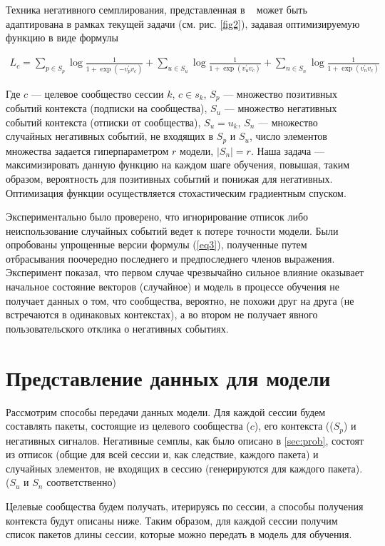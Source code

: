 \documentclass[times,specification,annotation]{itmo-student-thesis}
\begin{document}
Техника негативного семплирования, представленная в ~\cite{airbnb} может быть адаптирована в рамках текущей задачи (см. рис. \ref{fig2}), задавая оптимизируемую функцию в виде формулы

\begin{align}
L_c = \sum_{p \in S_p} \log \frac{1}{1 + \exp(-v_p^{'}v_c)} + \sum_{u \in S_u} \log \frac{1}{1 + \exp(v_u^{'}v_c)} + \sum_{n \in S_n} \log \frac{1}{1 + \exp(v_n^{'}v_c)} \label{eq3}
\end{align}

Где $c$ --- целевое сообщество сессии $k$, $c \in s_k$, $S_p$ --- множество позитивных событий
контекста (подписки на сообщества), $S_u$ --- множество негативных событий
контекста (отписки от сообщества), $S_u = u_k$, $S_n$ --- множество случайных негативных
событий, не входящих в $S_p$ и $S_u$, число элементов множества задается гиперпараметром $r$ модели, $|S_n| = r$. Наша задача --- максимизировать данную
функцию на каждом шаге обучения, повышая, таким образом, вероятность для
позитивных событий и понижая для негативных. Оптимизация функции осуществляется стохастическим градиентным спуском. 

Экспериментально было проверено, что игнорирование отписок либо неиспользование случайных событий ведет к потере точности модели. Были опробованы упрощенные версии формулы (\ref{eq3}), полученные путем отбрасывания
поочередно последнего и предпоследнего членов выражения. Эксперимент показал, что первом случае чрезвычайно сильное
влияние оказывает начальное состояние векторов (случайное) и модель в процессе обучения не получает данных о том, что сообщества, вероятно,
не похожи друг на друга (не встречаются в одинаковых контекстах), а во втором не получает явного пользовательского отклика о негативных событиях. 

\section{Представление данных для модели}\label{sec:dataf}

Рассмотрим способы передачи данных модели.
Для каждой сессии будем составлять пакеты, состоящие из целевого
сообщества ($c$), его контекста (($S_p$) и негативных сигналов. Негативные семплы, как было
описано в \ref{sec:prob}, состоят из отписок (общие для всей сессии и, как следствие,
каждого пакета) и случайных элементов, не входящих в сессию (генерируются для
каждого пакета). ($S_u$ и $S_n$ соответственно)

Целевые сообщества будем получать, итерируясь по сессии, а способы
получения контекста будут описаны ниже. Таким образом, для каждой сессии
получим список пакетов длины сессии, которые можно передать в модель для
обучения.
\end{document}
